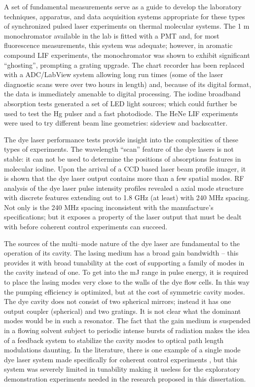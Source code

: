 A set of fundamental measurements serve as a guide to develop the laboratory techniques, apparatus, and data acquisition systems appropriate for these types of synchronized pulsed laser experiments on thermal molecular systems. The 1 m monochromator available in the lab is fitted with a PMT and, for most fluorescence measurements, this system was adequate; however, in aromatic compound LIF experiments, the monochromator was shown to exhibit significant ``ghosting'', prompting a grating upgrade. The chart recorder has been replaced with a ADC/LabView system allowing long run times (some of the laser diagnostic scans were over two hours in length) and, because of its digital format, the data is immediately amenable to digital processing. The iodine broadband absorption tests generated a set of LED light sources; which could further be used to test the Hg pulser and a fast photodiode. The HeNe LIF experiments were used to try different beam line geometries: sideview and backscatter.

The dye laser performance tests provide insight into the complexities of these types of experiments. The wavelength ``scan'' feature of the dye lasers is not stable: it can not be used to determine the positions of absorptions features in molecular iodine. Upon the arrival of a CCD based laser beam profile imager, it is shown that the dye laser output contains more than a few spatial modes. RF analysis of the dye laser pulse intensity profiles revealed a axial mode structure with discrete features extending out to 1.8 GHz (at least) with 240 MHz spacing. Not only is the 240 MHz spacing inconsistent with the manufacture's specifications; but it exposes a property of the laser output that must be dealt with before coherent control experiments can succeed.

The sources of the multi--mode nature of the dye laser are fundamental to the operation of its cavity. The lasing medium has a broad gain bandwidth -- this provides it with broad tunability at the cost of supporting a family of modes in the cavity instead of one. To get into the mJ range in pulse energy, it is required to place the lasing modes very close to the walls of the dye flow cells. In this way the pumping efficiency is optimized, but at the cost of symmetric cavity modes. The dye cavity does not consist of two spherical mirrors; instead it has one output coupler (spherical) and two gratings. It is not clear what the dominant modes would be in such a resonator. The fact that the gain medium is suspended in a flowing solvent subject to periodic intense bursts of radiation makes the idea of a feedback system to stabilize the cavity modes to optical path length modulations daunting. In the literature, there is one example of a single mode dye laser system made specifically for coherent control experiments \cite{Corless:1997a}, but this system was severely limited in tunability making it useless for the exploratory demonstration experiments needed in the research proposed in this dissertation.

